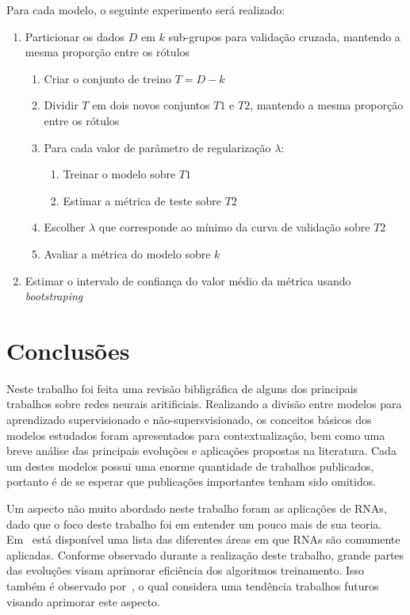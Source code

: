 \documentclass[conference]{IEEEtran}
\begin{document}
	Para cada modelo, o seguinte experimento será realizado:
	\begin{enumerate}
		\item Particionar os dados $D$ em $k$ sub-grupos para validação cruzada, mantendo a mesma proporção entre os rótulos
		\begin{enumerate}
			\item Criar o conjunto de treino $T = D - k$
			\item Dividir $T$ em dois novos conjuntos $T1$ e $T2$, mantendo a mesma proporção entre os rótulos
			\item Para cada valor de parâmetro de regularização $\lambda$:
			\begin{enumerate}
				\item Treinar o modelo sobre $T1$
				\item Estimar a métrica de teste sobre $T2$
			\end{enumerate}
			\item Escolher $\lambda$ que corresponde ao mínimo da curva de validação sobre $T2$
			\item Avaliar a métrica do modelo sobre $k$
		\end{enumerate}
		\item Estimar o intervalo de confiança do valor médio da métrica usando \textit{bootstraping}
	\end{enumerate}


			
	\section{Conclusões}
	
	Neste trabalho foi feita uma revisão bibligráfica de alguns dos principais trabalhos sobre redes neurais aritificiais. Realizando a divisão entre modelos para aprendizado supervisionado e não-supersvisionado, os conceitos básicos dos modelos estudados foram apresentados para contextualização, bem como uma breve análise das principais evoluções e aplicações propostas na literatura. Cada um destes modelos possui uma enorme quantidade de trabalhos publicados, portanto é de se esperar que publicações importantes tenham sido omitidos.
	
	Um aspecto não muito abordado neste trabalho foram as aplicações de RNAs, dado que o foco deste trabalho foi em entender um pouco mais de sua teoria. Em~\cite{abiodun2018state} está disponível uma lista das diferentes áreas em que RNAs são comumente aplicadas. Conforme observado durante a realização deste trabalho, grande partes das evoluções visam aprimorar eficiência dos algoritmos treinamento. Isso também é observado por~\cite{abiodun2018state}, o qual considera uma tendência trabalhos futuros visando aprimorar este aspecto.


    
	
	
\end{document}
